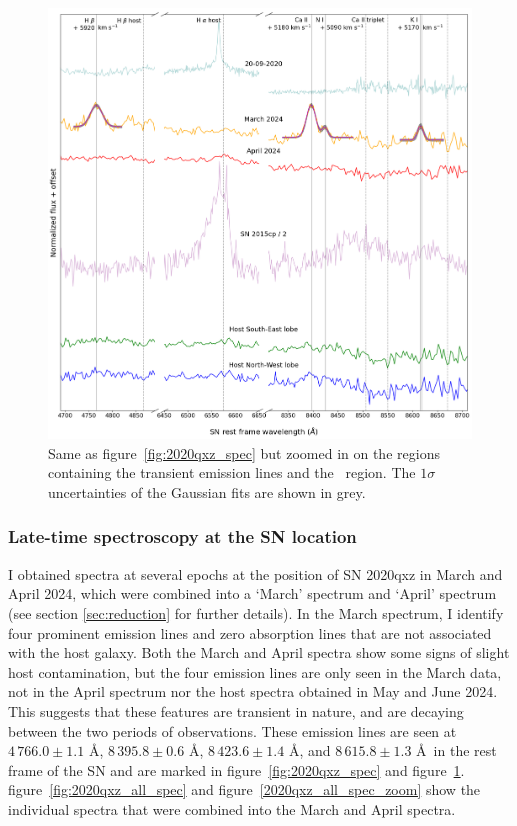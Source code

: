 \documentclass[a4paper,oneside,12pt, class=Latex/Classes/PhDthesisPSnPDF, crop=false]{standalone}
\begin{document}
\begin{figure}[h!]
    \centering
    \includegraphics[width=\textwidth]{../Images/chapter_5/2020qxz_spec_zoom.png}
    \caption[Regions with transient emission lines in SN 2020qxz spectra.]{Same as figure~\ref{fig:2020qxz_spec} but zoomed in on the regions containing the transient emission lines and the \Halpha\ region. The $1\sigma$ uncertainties of the Gaussian fits are shown in grey.}
    \label{2020qxz_spec_zoom}
\end{figure}

\subsubsection{Late-time spectroscopy at the SN location}
\label{2020qxz_spec}
I obtained spectra at several epochs at the position of SN 2020qxz in March and April 2024, which were combined into a `March' spectrum and `April' spectrum (see section \ref{sec:reduction} for further details). In the March spectrum, I identify four prominent emission lines and zero absorption lines that are not associated with the host galaxy. Both the March and April spectra show some signs of slight host contamination, but the four emission lines are only seen in the March data, not in the April spectrum nor the host spectra obtained in May and June 2024. This suggests that these features are transient in nature, and are decaying between the two periods of observations. These emission lines are seen at $4\,766.0\pm1.1$ \AA, $8\,395.8\pm0.6$ \AA, $8\,423.6\pm1.4$ \AA, and $8\,615.8\pm1.3$ \AA\ in the rest frame of the SN and are marked in figure~\ref{fig:2020qxz_spec} and figure~\ref{2020qxz_spec_zoom}. figure~\ref{fig:2020qxz_all_spec} and figure~\ref{2020qxz_all_spec_zoom} show the individual spectra that were combined into the March and April spectra.
\end{document}
